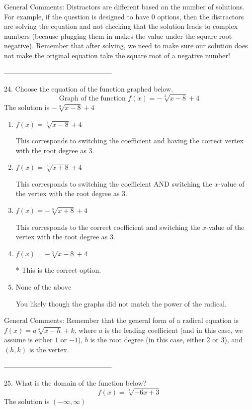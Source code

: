 \documentclass{extbook}[14pt]
\begin{document}
General Comments: Distractors are different based on the number of solutions. For example, if the question is designed to have 0 options, then the distractors are solving the equation and not checking that the solution leads to complex numbers (because plugging them in makes the value under the square root negative). Remember that after solving, we need to make sure our solution does not make the original equation take the square root of a negative number!

-----------------------------------------------

24. Choose the equation of the function graphed below.
\[ \text{Graph of the function } f(x) = - \sqrt[3]{x - 8} + 4 \] 
The solution is $ - \sqrt[3]{x - 8} + 4 $ 

\begin{enumerate}[label=\Alph*.] 
\item $ f(x) = \sqrt[3]{x - 8} + 4 $ 

 This corresponds to switching the coefficient and having the correct vertex with the root degree as $3$. 
\item $ f(x) = \sqrt[3]{x + 8} + 4 $ 

 This corresponds to switching the coefficient AND switching the $x$-value of the vertex with the root degree as $3$. 
\item $ f(x) = - \sqrt[3]{x + 8} + 4 $ 

 This corresponds to the correct coefficient and switching the $x$-value of the vertex with the root degree as $3$. 
\item $ f(x) = - \sqrt[3]{x - 8} + 4 $ 

 * This is the correct option. 
\item $ \text{None of the above} $ 

 You likely though the graphs did not match the power of the radical. 
\end{enumerate} 
 
General Comments: Remember that the general form of a radical equation is $ f(x) = a \sqrt[b]{x - h} + k$, where $a$ is the leading coefficient (and in this case, we assume is either $1$ or $-1$), $b$ is the root degree (in this case, either $2$ or $3$), and $(h, k)$ is the vertex.

-----------------------------------------------

25. What is the domain of the function below?
\[ f(x) = \sqrt[7]{-6 x + 3} \] 
The solution is $ (-\infty, \infty) $ 
\end{document}
